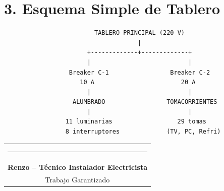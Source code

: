 \documentclass[11pt,a4paper]{article}
\begin{document}
\section*{3. Esquema Simple de Tablero}

\begin{verbatim}
                         TABLERO PRINCIPAL (220 V)
                                     |
                       +-------------+-------------+
                       |                           |
                  Breaker C-1                 Breaker C-2
                     10 A                        20 A
                       |                           |
                   ALUMBRADO                 TOMACORRIENTES
                       |                           |
                 11 luminarias                  29 tomas
                 8 interruptores             (TV, PC, Refri)
\end{verbatim}

\vspace{0.8cm}

\begin{table}[H]
\centering
\begin{tabular}{c}
    \rule{7cm}{0.4pt} \\
    \textbf{Renzo -- Técnico Instalador Electricista} \\
    Trabajo Garantizado
\end{tabular}
\end{table}
\end{document}

